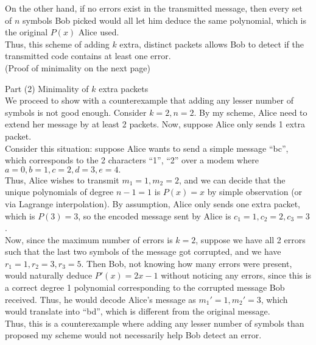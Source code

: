 \documentclass{article}
\begin{document}
On the other hand, if no errors exist in the transmitted message, then every set of $n$ symbols Bob picked would all let him deduce the same polynomial, which is the original $P(x)$ Alice used. \\

Thus, this scheme of adding $k$ extra, distinct packets allows Bob to detect if the transmitted code contains at least one error. \\

(Proof of minimality on the next page) \pagebreak

\noindent Part (2) Minimality of $k$ extra packets \\[.1cm]

We proceed to show with a counterexample that adding any lesser number of symbols is not good enough. Consider $k = 2, n = 2.$ By my scheme, Alice need to extend her message by at least 2 packets. Now, suppose Alice only sends 1 extra packet. \\

Consider this situation: suppose Alice wants to send a simple message ``bc'', which corresponds to the 2 characters ``1'', ``2'' over a modem where $a = 0, b = 1, c = 2, d = 3, e = 4.$ \\

Thus, Alice wishes to transmit $m_1 = 1, m_2 = 2$, and we can decide that the unique polynomials of degree $n-1 = 1$ is $P(x) = x$ by simple observation (or via Lagrange interpolation). By assumption, Alice only sends one extra  packet, which is $P(3) = 3$, so the encoded message sent by Alice is $c_1 = 1, c_2 = 2, c_3 = 3$. \\

Now, since the maximum number of errors is $k = 2$, suppose we have all 2 errors such that the last two symbols of the message got corrupted, and we have $r_1 = 1, r_2 = 3, r_3 = 5$. Then Bob, not knowing how many errors were present, would naturally deduce $P'(x) = 2x-1$ without noticing any errors, since this is a correct degree 1 polynomial corresponding to the corrupted message Bob received. Thus, he would decode Alice's message as $m_1' = 1, m_2' = 3$, which would translate into ``bd'', which is different from the original message. \\

Thus, this is a counterexample where adding any lesser number of symbols than proposed my scheme would not necessarily help Bob detect an error.
\end{document}
